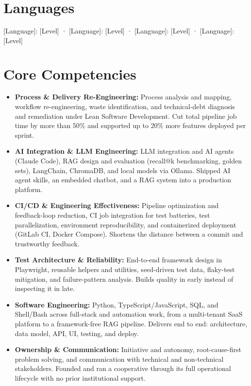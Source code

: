 \documentclass[10pt,a4paper]{article}
\newcommand{\cvcomp}[2]{\item {\bfseries #1:} #2}
\begin{document}
\section{Languages}

[Language]: [Level] · [Language]: [Level] · [Language]: [Level] · [Language]: [Level]

\newpage


\section{Core Competencies}

\begin{itemize}
\cvcomp{Process \& Delivery Re-Engineering}{Process analysis and mapping, workflow re-engineering, waste identification, and technical-debt diagnosis and remediation under Lean Software Development. Cut total pipeline job time by more than 50\% and supported up to 20\% more features deployed per sprint.}
\cvcomp{AI Integration \& LLM Engineering}{LLM integration and AI agents (Claude Code), RAG design and evaluation (recall@k benchmarking, golden sets), LangChain, ChromaDB, and local models via Ollama. Shipped AI agent skills, an embedded chatbot, and a RAG system into a production platform.}
\cvcomp{CI/CD \& Engineering Effectiveness}{Pipeline optimization and feedback-loop reduction, CI job integration for test batteries, test parallelization, environment reproducibility, and containerized deployment (GitLab CI, Docker Compose). Shortens the distance between a commit and trustworthy feedback.}
\cvcomp{Test Architecture \& Reliability}{End-to-end framework design in Playwright, reusable helpers and utilities, seed-driven test data, flaky-test mitigation, and failure-pattern analysis. Builds quality in early instead of inspecting it in late.}
\cvcomp{Software Engineering}{Python, TypeScript/JavaScript, SQL, and Shell/Bash across full-stack and automation work, from a multi-tenant SaaS platform to a framework-free RAG pipeline. Delivers end to end: architecture, data model, API, UI, testing, and deploy.}
\cvcomp{Ownership \& Communication}{Initiative and autonomy, root-cause-first problem solving, and communication with technical and non-technical stakeholders. Founded and ran a cooperative through its full operational lifecycle with no prior institutional support.}
\end{itemize}
\end{document}
